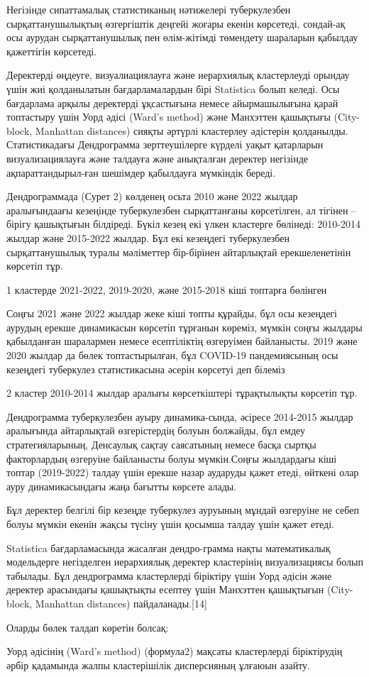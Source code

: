 \begin{multicols}{2}

Негізінде сипаттамалық статистиканың нәтижелері туберкулезбен
сырқаттанушылықтың өзгергіштік деңгейі жоғары екенін көрсетеді,
сондай-ақ осы аурудан сырқаттанушылық пен өлім-жітімді төмендету
шараларын қабылдау қажеттігін көрсетеді.
  
Деректерді өңдеуге, визуалиациялауға және иерархиялық кластерлеуді
орындау үшін жиі қолданылатын бағдарламалардын бірі Statistica болып
келеді. Осы бағдарлама арқылы деректерді ұқсастығына немесе
айырмашылығына қарай топтастыру үшін Уорд әдісі (Ward's method) және
Манхэттен қашықтығы (City-block, Manhattan distances) сияқты әртүрлі
кластерлеу әдістерін қолданылды. Статистикадағы Дендрограмма
зерттеушілерге күрделі уақыт қатарларын визуализациялауға және талдауға
және анықталған деректер негізінде ақпараттандырыл-ған шешімдер
қабылдауға мүмкіндік береді.

Дендрограммада (Сурет 2) көлденең осьта 2010 және 2022 жылдар
аралығындаағы кезеңінде туберкулезбен сырқаттанғаны көрсетілген, ал
тігінен -- бірігу қашықтығын білдіреді. Бүкіл кезең екі үлкен кластерге
бөлінеді: 2010-2014 жылдар және 2015-2022 жылдар. Бұл екі кезеңдегі
туберкулезбен сырқаттанушылық туралы мәліметтер бір-бірінен айтарлықтай
ерекшеленетінін көрсетіп тұр.

1 кластерде 2021-2022, 2019-2020, және 2015-2018 кіші топтарға бөлінген

Соңғы 2021 және 2022 жылдар жеке кіші топты құрайды, бұл осы кезеңдегі
аурудың ерекше динамикасын көрсетіп тұрғанын көреміз, мүмкін соңғы
жылдары қабылданған шаралармен немесе есептіліктің өзгеруімен
байланысты. 2019 және 2020 жылдар да бөлек топтастырылған, бұл COVID-19
пандемиясының осы кезеңдегі туберкулез статистикасына әсерін көрсетуі
деп білеміз

2 кластер 2010-2014 жылдар аралығы көрсеткіштері тұрақтылықты көрсетіп
тұр.

Дендрограмма туберкулезбен ауыру динамика-сында, әсіресе 2014-2015 жылдар
аралығында айтарлықтай өзгерістердің болуын болжайды, бұл емдеу
стратегияларының, Денсаулық сақтау саясатының немесе басқа сыртқы
факторлардың өзгеруіне байланысты болуы мүмкін.Соңғы жылдардағы кіші
топтар (2019-2022) талдау үшін ерекше назар аударуды қажет етеді,
өйткені олар ауру динамикасындағы жаңа бағытты көрсете алады.

Бұл деректер белгілі бір кезеңде туберкулез ауруының мұндай өзгеруіне не
себеп болуы мүмкін екенін жақсы түсіну үшін қосымша талдау үшін қажет
етеді.

Statistica бағдарламасында жасалған дендро-грамма нақты математикалық
модельдерге негізделген иерархиялық деректер кластерінің визуализациясы
болып табылады. Бұл дендрограмма кластерлерді біріктіру үшін Уорд әдісін
және деректер арасындағы қашықтықты есептеу үшін Манхэттен қашықтығын
(City-block, Manhattan distances) пайдаланады.{[}14{]}

Оларды бөлек талдап көретін болсақ:

Уорд әдісінің (Ward's method) (формула2) мақсаты кластерлерді
біріктірудің әрбір қадамында жалпы кластерішілік дисперсияның ұлғаюын
азайту.
\end{multicols}

